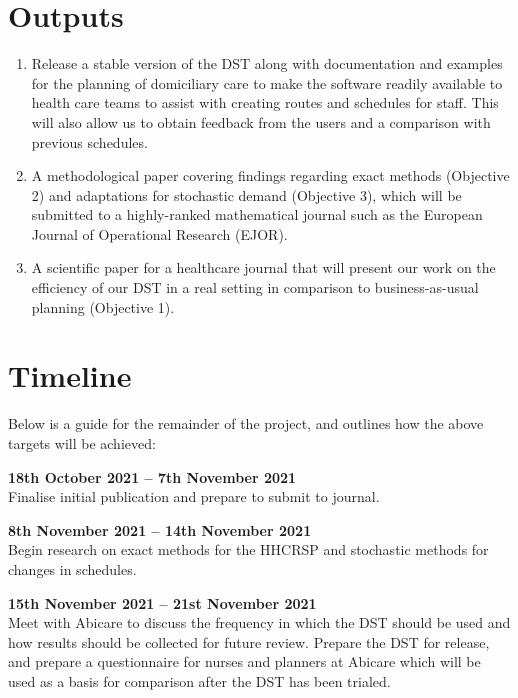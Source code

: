 \documentclass[a4paper]{article}
\begin{document}
\section*{Outputs}
\begin{enumerate}[leftmargin=*]
	\item Release a stable version of the DST along with documentation and examples for the planning of domiciliary care to make the software readily available to health care teams to assist with creating routes and schedules for staff. This will also allow us to obtain feedback from the users and a comparison with previous schedules.
	\item A methodological paper covering findings regarding exact methods (Objective 2) and adaptations for stochastic demand (Objective 3), which will be submitted to a highly-ranked mathematical journal such as the European Journal of Operational Research (EJOR).
	\item A scientific paper for a healthcare journal that will present our work on the efficiency of our DST in a real setting in comparison to business-as-usual planning (Objective 1). 
\end{enumerate}	



\section*{Timeline}
Below is a guide for the remainder of the project, and outlines how the above targets will be achieved:

\textbf{18th October 2021 -- 7th November 2021}\\
Finalise initial publication and prepare to submit to journal.

\textbf{8th November 2021 -- 14th November 2021}\\
Begin research on exact methods for the HHCRSP and stochastic methods for changes in schedules.

\textbf{15th November 2021 -- 21st November 2021}\\
Meet with Abicare to discuss the frequency in which the DST should be used and how results should be collected for future review. Prepare the DST for release, and prepare a questionnaire for nurses and planners at Abicare which will be used as a basis for comparison after the DST has been trialed.
\end{document}

